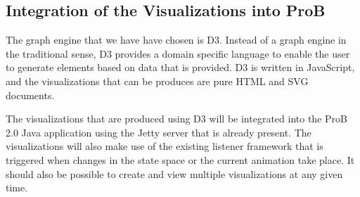 \subsection{Integration of the Visualizations into ProB}

The graph engine that we have have chosen is D3. Instead of a graph engine in the traditional sense, D3 provides a domain specific language to enable the user to generate elements based on data that is provided. D3 is written in JavaScript, and the visualizations that can be produces are pure HTML and SVG documents.

The visualizations that are produced using D3 will be integrated into the ProB 2.0 Java application using the Jetty server that is already present. The visualizations will also make use of the existing listener framework that is triggered when changes in the state space or the current animation take place. It should also be possible to create and view multiple visualizations at any given time. 







